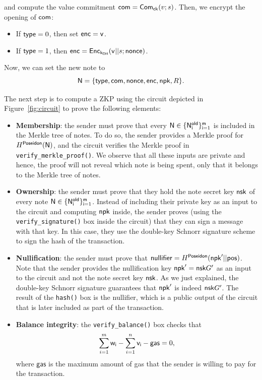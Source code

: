and compute the value commitment $\mathsf{com} = \mathsf{Com}_{\mathsf{ck}}(v;s)$. Then, we encrypt the opening of $\mathsf{com}$:

\begin{itemize}
	\item If $\mathsf{type} = 0$, then set $\mathsf{enc} = \mathsf{v_{}}$.
	\item If $\mathsf{type} = 1$, then 
	$\mathsf{enc} = \mathsf{Enc}_{\mathsf{k_{DH}}} (\mathsf{v_{}}||s; \mathsf{nonce})$.
\end{itemize}

Now, we can set the new note to \[\mathsf{N} = \{\mathsf{type}, \mathsf{com}, \mathsf{nonce}, \mathsf{enc}, \mathsf{npk}, R\}.\]

The next step is to compute a ZKP using the circuit depicted in Figure~\ref{fig:circuit} to prove the following elements:

\begin{itemize}
	\item \textbf{Membership}: the sender must prove that every $\mathsf{N}\in\{\mathsf{N^{old}_{i}}\}_{\mathsf{i} = 1}^{\mathsf{m}}$ is included in the Merkle tree of notes. To do so, the sender provides a Merkle proof for $H^\mathsf{Poseidon}(\mathsf{N})$, and the circuit verifies the Merkle proof in \texttt{verify\_merkle\_proof()}. We observe that all these inputs are private and hence, the proof will not reveal which note is being spent, only that it belongs to the Merkle tree of notes. 

	\item \textbf{Ownership}: the sender must prove that they hold the note secret key $\mathsf{nsk}$ of every note $\mathsf{N}\in\{\mathsf{N^{old}_{i}}\}_{\mathsf{i} = 1}^{\mathsf{m}}$. 
	Instead of including their private key as an input to the circuit and computing $\mathsf{npk}$ inside, the sender proves (using the \texttt{verify\_signature()} box inside the circuit) that they can sign a message with that key. In this case, they use the double-key Schnorr signature scheme to sign the hash of the transaction. 

	\item \textbf{Nullification}: the sender must prove that $\mathsf{nullifier}=H^\mathsf{Poseidon}(\mathsf{npk}' || \mathsf{pos})$. Note that the sender provides the nullification key $\mathsf{npk}' = \mathsf{nsk} G'$ as an input to the circuit and not the note secret key $\mathsf{nsk}$. As we just explained, the double-key Schnorr signature guarantees that $\mathsf{npk}'$ is indeed $\mathsf{nsk} G'$. The result of the \texttt{hash()} box is the nullifier, which is a public output of the circuit that is later included as part of the transaction.
	
	\item \textbf{Balance integrity}: the \texttt{verify\_balance()} box checks that 
	\begin{equation}\label{eq:balance}
		\sum_{i = 1}^m \mathsf{w_{i}} - \sum_{i = 1}^n \mathsf{v_{i}} - \mathsf{gas} = 0,
	\end{equation} where $\mathsf{gas}$ is the maximum amount of gas that the sender is willing to pay for the transaction.
\end{itemize}

